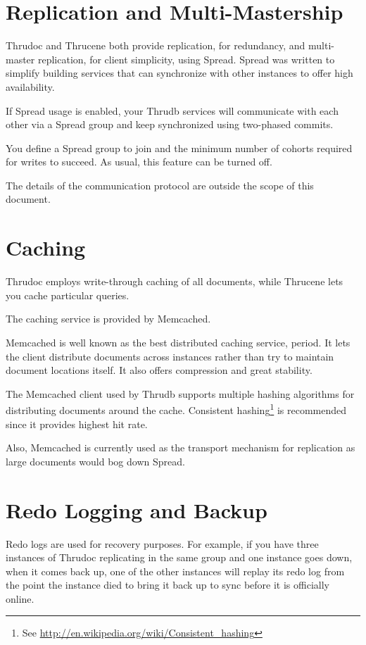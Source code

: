 \documentclass[nocopyrightspace,blockstyle]{sigplanconf}
\begin{document}
\section{Replication and Multi-Mastership}

Thrudoc and Thrucene both provide replication, for redundancy, and multi-master replication, for client simplicity, using
Spread.  Spread was written to simplify building services that can synchronize with other instances to offer high availability.

If Spread usage is enabled, your Thrudb services will communicate with each other via a Spread group and keep synchronized using two-phased commits.

You define a Spread group to join and the minimum number of cohorts required for writes to succeed.  As usual, this feature can be turned off.

The details of the communication protocol are outside the scope of this document.

\section{Caching}

Thrudoc employs write-through caching of all documents, while Thrucene lets you cache particular queries.

The caching service is provided by Memcached.

Memcached is well known as the best distributed caching service, period.
It lets the client distribute documents across instances rather than try to maintain document locations itself.
It also offers compression and great stability.

The Memcached client used by Thrudb supports multiple hashing algorithms for distributing documents around the cache.
Consistent hashing\footnote{See \url{http://en.wikipedia.org/wiki/Consistent_hashing}} is recommended since it provides highest hit rate.

Also, Memcached is currently used as the transport mechanism for replication as large documents would bog down Spread.

\section{Redo Logging and Backup}

Redo logs are used for recovery purposes.
For example, if you have three instances of Thrudoc replicating in the same group and one instance goes down, when it comes back up,
one of the other instances will replay its redo log from the point the instance died to bring it back up to sync before it is
officially online.
\end{document}
